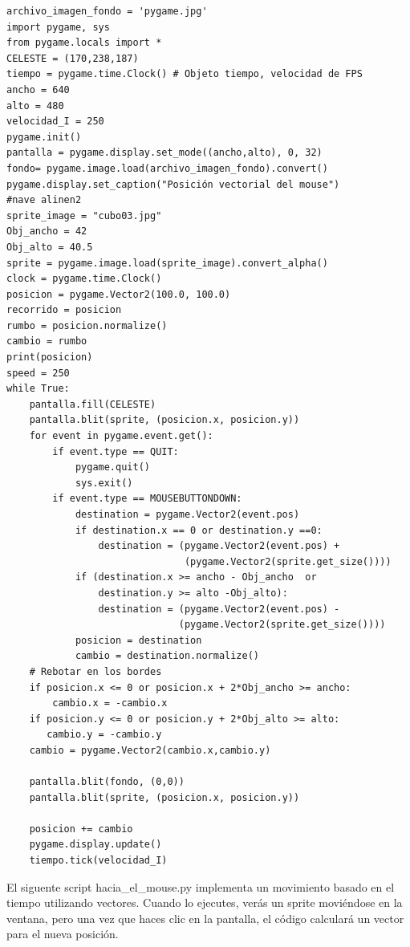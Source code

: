 {\vspace{-0.2cm}
\hspace{-2.8cm}{\ttfamily \scriptsize \_vectorial.py}\vspace{-0.84cm}
\begin{lstlisting}
archivo_imagen_fondo = 'pygame.jpg'
import pygame, sys
from pygame.locals import *
CELESTE = (170,238,187)
tiempo = pygame.time.Clock() # Objeto tiempo, velocidad de FPS
ancho = 640
alto = 480
velocidad_I = 250
pygame.init()
pantalla = pygame.display.set_mode((ancho,alto), 0, 32)
fondo= pygame.image.load(archivo_imagen_fondo).convert()
pygame.display.set_caption("Posición vectorial del mouse")
#nave alinen2 
sprite_image = "cubo03.jpg"
Obj_ancho = 42
Obj_alto = 40.5
sprite = pygame.image.load(sprite_image).convert_alpha()
clock = pygame.time.Clock()
posicion = pygame.Vector2(100.0, 100.0)
recorrido = posicion
rumbo = posicion.normalize()
cambio = rumbo
print(posicion)
speed = 250
while True:
    pantalla.fill(CELESTE)
    pantalla.blit(sprite, (posicion.x, posicion.y))
    for event in pygame.event.get():
        if event.type == QUIT:
            pygame.quit()
            sys.exit()
        if event.type == MOUSEBUTTONDOWN:             
            destination = pygame.Vector2(event.pos)           
            if destination.x == 0 or destination.y ==0:
                destination = (pygame.Vector2(event.pos) + 
                               (pygame.Vector2(sprite.get_size())))
            if (destination.x >= ancho - Obj_ancho  or 
                destination.y >= alto -Obj_alto): 
                destination = (pygame.Vector2(event.pos) - 
                              (pygame.Vector2(sprite.get_size())))
            posicion = destination
            cambio = destination.normalize()
    # Rebotar en los bordes
    if posicion.x <= 0 or posicion.x + 2*Obj_ancho >= ancho:
        cambio.x = -cambio.x       
    if posicion.y <= 0 or posicion.y + 2*Obj_alto >= alto:
       cambio.y = -cambio.y
    cambio = pygame.Vector2(cambio.x,cambio.y)   

    pantalla.blit(fondo, (0,0)) 
    pantalla.blit(sprite, (posicion.x, posicion.y))  

    posicion += cambio
    pygame.display.update()
    tiempo.tick(velocidad_I)    
\end{lstlisting}	


El siguente script {\ttfamily hacia\_el\_mouse.py} implementa un movimiento basado en el tiempo utilizando vectores. Cuando lo ejecutes, verás un sprite moviéndose  en la ventana, pero una vez que haces clic en la pantalla, el código calculará un vector para el nueva posición. 

}
